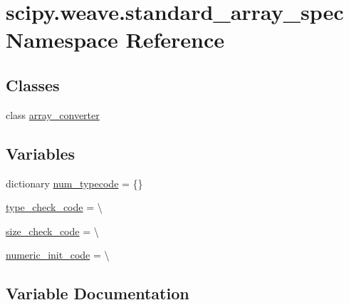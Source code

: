 \hypertarget{namespacescipy_1_1weave_1_1standard__array__spec}{}\section{scipy.\+weave.\+standard\+\_\+array\+\_\+spec Namespace Reference}
\label{namespacescipy_1_1weave_1_1standard__array__spec}
\subsection*{Classes}
\begin{DoxyCompactItemize}
\item 
class \hyperlink{classscipy_1_1weave_1_1standard__array__spec_1_1array__converter}{array\+\_\+converter}
\end{DoxyCompactItemize}
\subsection*{Variables}
\begin{DoxyCompactItemize}
\item 
dictionary \hyperlink{namespacescipy_1_1weave_1_1standard__array__spec_acb129e29cb8255fe62c69acda54a166c}{num\+\_\+typecode} = \{\}
\item 
\hyperlink{namespacescipy_1_1weave_1_1standard__array__spec_afb1c861272d18bd442dea21b78f75de6}{type\+\_\+check\+\_\+code} = \textbackslash{}
\item 
\hyperlink{namespacescipy_1_1weave_1_1standard__array__spec_ab2879aa68d6e349df88e864760c06b81}{size\+\_\+check\+\_\+code} = \textbackslash{}
\item 
\hyperlink{namespacescipy_1_1weave_1_1standard__array__spec_a38952cfcfbfb612d34039f5ec3976be9}{numeric\+\_\+init\+\_\+code} = \textbackslash{}
\end{DoxyCompactItemize}


\subsection{Variable Documentation}
\hypertarget{namespacescipy_1_1weave_1_1standard__array__spec_acb129e29cb8255fe62c69acda54a166c}{}
